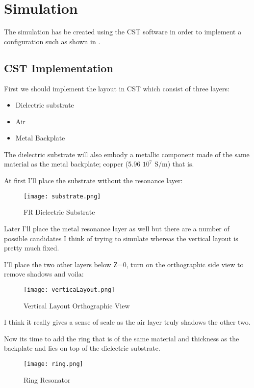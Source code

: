 \section{\textsf{Simulation}}
    The simulation has be created using the CST software in order to implement a configuration such as shown in \cite{zhang_design_2023}.

    \subsection{\textsf{CST Implementation}}
        First we should implement the layout in CST which consist of three layers:
        \begin{itemize}
            \item Dielectric substrate
            \item Air
            \item Metal Backplate
        \end{itemize}

        The dielectric substrate will also embody a metallic component made of the same material as the metal backplate; copper
        (5.96 \mu $10^7$ S/m) that is.

        At first I'll place the substrate without the resonance layer:  
        \begin{figure}[h]
            \centering
            \texttt{[image: substrate.png]}
            \caption{FR Dielectric Substrate}
            \label{img:substrate}
        \end{figure}

        Later I'll place the metal resonance layer as well but there are a number of possible candidates
        I think of trying to simulate whereas the vertical layout is pretty much fixed.

        I'll place the two other layers below Z=0, turn on the orthographic side
        view to remove shadows and voila: 
        \begin{figure}[b]
            \centering
            \texttt{[image: verticaLayout.png]}
            \caption{Vertical Layout Orthographic View}
            \label{img:verticaLayout}
        \end{figure}
        I think it really gives a sense of scale as the air layer truly shadows the other two.

        Now its time to add the ring that is of the same material and thickness as the backplate and lies
        on top of the dielectric substrate. 
        \begin{figure}[b]
            \centering
            \texttt{[image: ring.png]}
            \caption{Ring Resonator}
            \label{img:ring}
        \end{figure}

